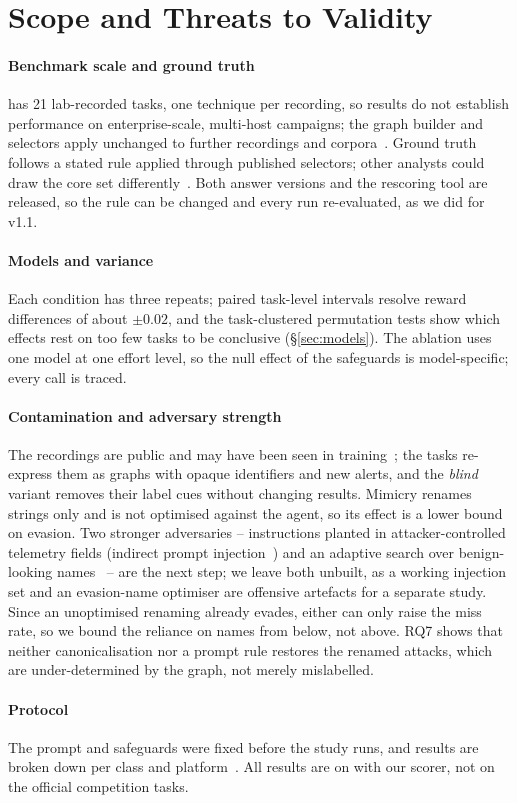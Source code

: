 \section{Scope and Threats to Validity}
\label{sec:limitations}

\paragraph{Benchmark scale and ground truth} \bench has 21 lab-recorded tasks, one technique per recording, so
results do not establish performance on enterprise-scale, multi-host campaigns; the graph builder and selectors
apply unchanged to further recordings and corpora~\cite{darpa_tc,landauer2023maintainable,grimmer2023lidds}.
Ground truth follows a stated rule applied through published selectors; other analysts could draw the core set
differently~\cite{jiang2025orthrus,bilot2025simpler}. Both answer versions and the rescoring tool are released,
so the rule can be changed and every run re-evaluated, as we did for v1.1.

\paragraph{Models and variance} Each condition has three repeats; paired task-level intervals resolve reward
differences of about $\pm0.02$, and the task-clustered permutation tests show which effects rest on too few
tasks to be conclusive (\S\ref{sec:models}). The ablation uses one model at one effort level, so the null effect
of the safeguards is model-specific; every call is traced.

\paragraph{Contamination and adversary strength} The recordings are public and may have been seen in
training~\cite{sainz2023contamination}; the tasks re-express them as graphs with opaque identifiers and new
alerts, and the \emph{blind} variant removes their label cues without changing results. Mimicry renames strings
only and is not optimised against the agent, so its effect is a lower bound on evasion. Two stronger adversaries
-- instructions planted in attacker-controlled telemetry fields (indirect prompt
injection~\cite{greshake2023indirect,debenedetti2024agentdojo}) and an adaptive search over benign-looking
names~\cite{yefet2020adversarial} -- are the next step; we leave both unbuilt, as a working injection set and an
evasion-name optimiser are offensive artefacts for a separate study. Since an unoptimised renaming already
evades, either can only raise the miss rate, so we bound the reliance on names from below, not above. RQ7 shows
that neither canonicalisation nor a prompt rule restores the renamed attacks, which are under-determined by the
graph, not merely mislabelled.

\paragraph{Protocol} The prompt and safeguards were fixed before the study runs, and results are broken down
per class and platform~\cite{arp2022dosdonts}. All results are on \bench with our scorer, not on the official
competition tasks.

\ifconf\else

\fi

